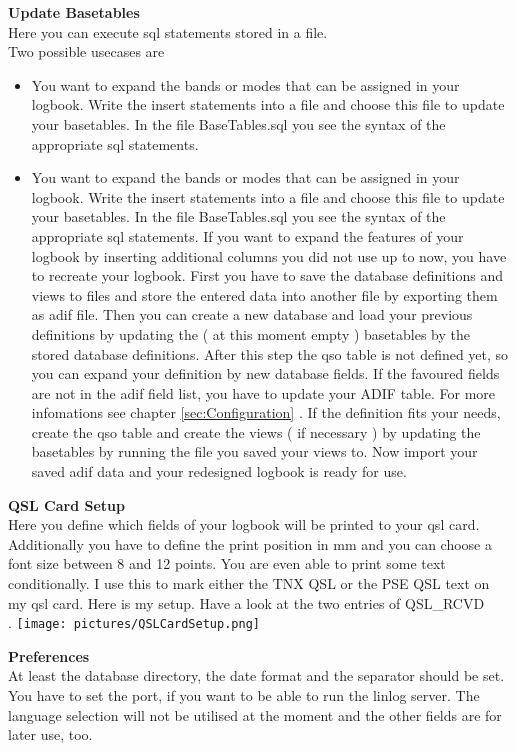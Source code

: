 \documentclass[a4paper,11pt]{article}
\begin{document}
\begin{flushleft}
\textbf{Update Basetables}\\
Here you can execute sql statements stored in a file.\\
Two possible usecases are
\begin{itemize}
  \item
You want to expand the bands or modes that can be assigned in your
logbook. Write the insert statements into a file and choose this file to
update your basetables. In the file BaseTables.sql you see the syntax of
the appropriate sql statements.
\item 
You want to expand the bands or modes that can be assigned in your
logbook. Write the insert statements into a file and choose this file to
update your basetables. In the file BaseTables.sql you see the syntax of
the appropriate sql statements.
If you want to expand the features of your logbook by inserting additional
columns you did not use up to now, you have to recreate your logbook.
First you have to save the database definitions and views to files and store
the entered data into another file by exporting them as adif file.
Then you can create a new database and load your previous definitions by
updating the ( at this moment empty ) basetables by the stored database
definitions.
After this step the qso table is not defined yet, so you can expand your
definition by new database fields. If the favoured fields are not in the adif
field list, you have to update your ADIF table. For more infomations see
chapter \ref{sec:Configuration} . If the definition fits your needs, create the qso table and create
the views ( if necessary ) by updating the basetables by running the file
you saved your views to.
Now import your saved adif data and your redesigned logbook is ready for
use.
\end{itemize}
\textbf{QSL Card Setup}\\
Here you define which fields of your logbook will be printed to your qsl card.
Additionally you have to define the print position in mm and you can choose a font size between 8 and 12 points.
You are even able to print some text conditionally. I use this to mark either the
TNX QSL or the PSE QSL text on my qsl card.
Here is my setup. Have a look at the two entries of QSL\_RCVD\\.
\vspace*{5mm}
\texttt{[image: pictures/QSLCardSetup.png]} 

\textbf{Preferences}\\
At least the database directory, the date format and the separator should be
set. You have to set the port, if you want to be able to run the linlog server.
The language selection will not be utilised at the moment and the other fields
are for later use, too.
\end{flushleft}
\end{document}
